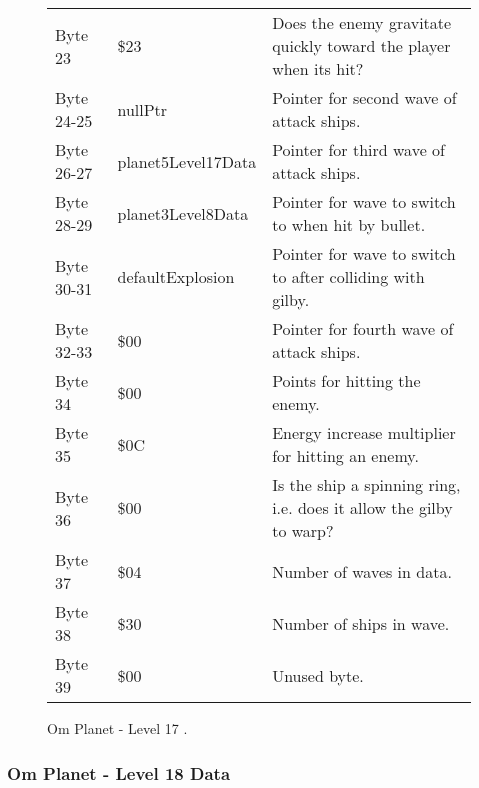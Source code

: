 \begin{figure}[H]
{\begin{adjustbox}{width=12cm}
\begin{tabular}{lll}
 Byte 23    & \$23                & Does the enemy gravitate quickly toward the player when its hit?    \\
 Byte 24-25 & nullPtr            & Pointer for second wave of attack ships.                            \\
 Byte 26-27 & planet5Level17Data & Pointer for third wave of attack ships.                             \\
 Byte 28-29 & planet3Level8Data  & Pointer for wave to switch to when hit by bullet.                   \\
 Byte 30-31 & defaultExplosion   & Pointer for  wave to switch to after colliding with gilby.          \\
 Byte 32-33 & \$00                & Pointer for fourth wave of attack ships.                            \\
 Byte 34    & \$00                & Points for hitting the enemy.                                       \\
 Byte 35    & \$0C                & Energy increase multiplier for hitting an enemy.                    \\
 Byte 36    & \$00                & Is the ship a spinning ring, i.e. does it allow the gilby to warp?  \\
 Byte 37    & \$04                & Number of waves in data.                                            \\
 Byte 38    & \$30                & Number of ships in wave.                                            \\
 Byte 39    & \$00                & Unused byte.                                                        \\
\bottomrule
\end{tabular}

  \end{adjustbox}

  }\caption*{Om Planet - Level 17
.}
\end{figure}

\clearpage
\subsubsection{Om Planet - Level 18 Data}

